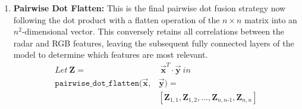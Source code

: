 \documentclass{mpaper}
\begin{document}
\begin{enumerate}
    \item \textbf{Pairwise Dot Flatten:} This is the final pairwise dot fusion strategy now following the dot product with a flatten operation of the $n \times n$ matrix into an $n^2$-dimensional vector. This conversely retains all correlations between the radar and RGB features, leaving the subsequent fully connected layers of the model to determine which features are most relevant.
    \vspace*{-0.1cm}
    \begin{align*}
        \mathit{Let} \ \bm{Z} = & \ \bm{\vec{x}}^T \cdot \bm{\vec{y}} \ \mathit{in} \\
        \mathtt{pairwise\_dot\_flatten}(\bm{\vec{x}}, &\bm{\vec{y}}) =\\ &\left[ \bm{Z}_{1,1}, \bm{Z}_{1,2}, \ldots, \bm{Z}_{n,n\text{-}1}, \bm{Z}_{n,n} \right]
    \end{align*} 
    \vspace*{-0.8cm}


\end{enumerate}
\end{document}
